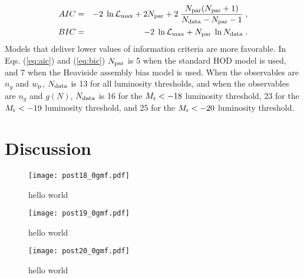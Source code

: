 \documentclass[14pt, preprint]{emulateapj}
\newcommand{\wpp}{w_{\rm p}}
\newcommand{\ngal}{n_{g}}
\newcommand{\gmf}{g(N)}
\newcommand{\mr}{M_{\rm r}}
\begin{document}
\begin{eqnarray}
AIC&=& -2\;\ln \mathcal{L}_{\rm max} + 2N_{\rm par} + 2\;\frac{N_{\rm par}(N_{\rm par}+1)}{N_{\rm data}-N_{\rm par}-1} \; , \label{eq:aic}\\
BIC&=& -2\;\ln \mathcal{L}_{\rm max} + N_{\rm par}\;\ln N_{\rm data} \; . \label{eq:bic}
\end{eqnarray}
Models that deliver lower values of information criteria are more favorable. In Eqs. (\ref{eq:aic}) and (\ref{eq:bic}) $N_{\rm par}$ is 5 when the standard HOD model is used, and 7 when the Heaviside assembly bias model is used. When the observables are $\ngal$ and $\wpp$, $N_{\rm data}$ is 13 for all luminosity thresholds, and when the observables are $\ngal$ and $\gmf$, $N_{\rm data}$ is 16 for the $\mr < -18$ luminosity threshold, 23 for the $\mr < -19$ luminosity threshold, and 25 for the $\mr < -20$ luminosity threshold. 




\section{Discussion}




\begin{figure*}
\begin{center}
\texttt{[image: post18\_0gmf.pdf]}
\caption{hello world}
\label{fig:abc_converge}
\end{center}
\end{figure*}

\begin{figure*}
\begin{center}
\texttt{[image: post19\_0gmf.pdf]}
\caption{hello world}
\label{fig:abc_converge}
\end{center}
\end{figure*}

\begin{figure*}
\begin{center}
\texttt{[image: post20\_0gmf.pdf]}
\caption{hello world}
\label{fig:abc_converge}
\end{center}
\end{figure*}
\end{document}

